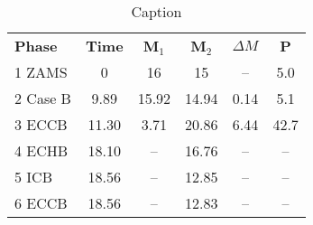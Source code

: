 

\begin{table}
\begin{tabular}{lccccc}
\hline
\textbf{Phase}        & \textbf{Time} & \textbf{M$_1$}  & \textbf{M$_2$} &  \textbf{$\Delta M$} & \textbf{P} \\   
1 ZAMS           & 0      & 16     & 15    & --   & 5.0   \\            
2 Case B       & 9.89   & 15.92  & 14.94 & 0.14 & 5.1   \\
3 ECCB        & 11.30  &  3.71  & 20.86 & 6.44 & 42.7  \\
4 ECHB      & 18.10  & --     & 16.76 &  --  & --    \\
5 ICB       & 18.56  & --     & 12.85 &  --  & --    \\    
6 ECCB      & 18.56  & --     & 12.83 &  --  & --    \\
\hline
\end{tabular}
\caption{Caption}
\end{table}
